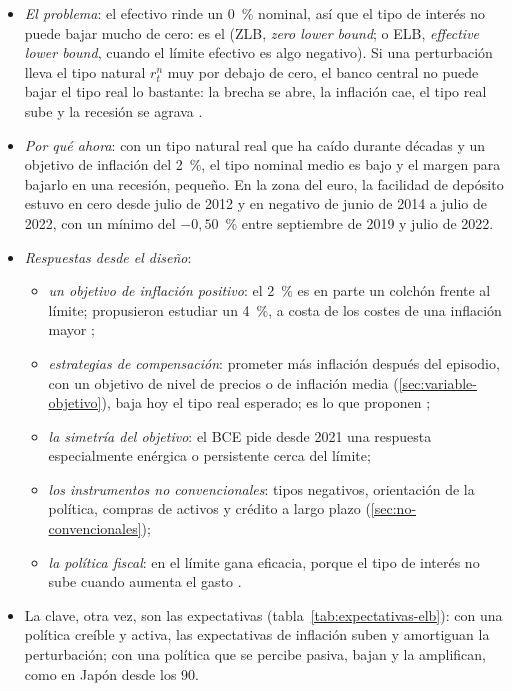 \documentclass[11pt]{article}
\begin{document}
\begin{itemize}
\item \emph{El problema}: el efectivo rinde un 0~\% nominal, así que el tipo de interés no puede bajar mucho de cero: es el  (ZLB, \emph{zero lower bound}; o ELB, \emph{effective lower bound}, cuando el límite efectivo es algo negativo). Si una perturbación lleva el tipo natural $r^n_t$ muy por debajo de cero, el banco central no puede bajar el tipo real lo bastante: la brecha se abre, la inflación cae, el tipo real sube y la recesión se agrava\nocite{EggertssonWoodford2003Zero} .
\item \emph{Por qué ahora}: con un tipo natural real que ha caído durante décadas\nocite{HolstonLaubachWilliams2017Measuring} y un objetivo de inflación del 2~\%, el tipo nominal medio es bajo y el margen para bajarlo en una recesión, pequeño. En la zona del euro, la facilidad de depósito estuvo en cero desde julio de 2012 y en negativo de junio de 2014 a julio de 2022, con un mínimo del $-0{,}50$~\% entre septiembre de 2019 y julio de 2022\nocite{BCE2026TiposOficiales}.
\item \emph{Respuestas desde el diseño}:
  \begin{itemize}
  \item \emph{un objetivo de inflación positivo}: el 2~\% es en parte un colchón frente al límite; \textcite{BlanchardDellAricciaMauro2010} propusieron estudiar un 4~\%, a costa de los costes de una inflación mayor ;
  \item \emph{estrategias de compensación}: prometer más inflación después del episodio, con un objetivo de nivel de precios o de inflación media (\ref{sec:variable-objetivo}), baja hoy el tipo real esperado; es lo que proponen \textcite{EggertssonWoodford2003Zero} ;
  \item \emph{la simetría del objetivo}: el BCE pide desde 2021 una respuesta especialmente enérgica o persistente cerca del límite\nocite{BCE2021Estrategia};
  \item \emph{los instrumentos no convencionales}: tipos negativos, orientación de la política, compras de activos y crédito a largo plazo (\ref{sec:no-convencionales});
  \item \emph{la política fiscal}: en el límite gana eficacia, porque el tipo de interés no sube cuando aumenta el gasto .
  \end{itemize}
\item La clave, otra vez, son las expectativas (tabla~\ref{tab:expectativas-elb}): con una política creíble y activa, las expectativas de inflación suben y amortiguan la perturbación; con una política que se percibe pasiva, bajan y la amplifican, como en Japón desde los 90.
\end{itemize}
\end{document}
